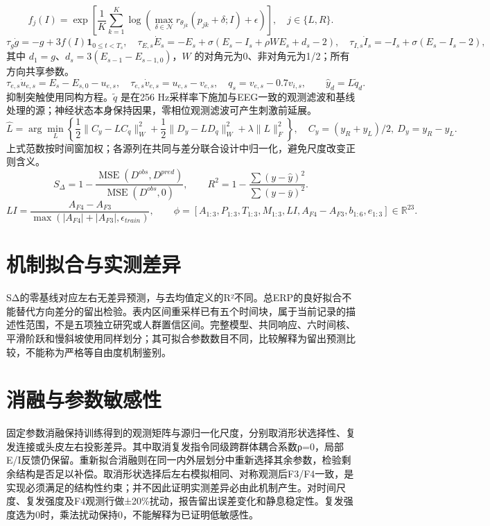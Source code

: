 \documentclass[UTF8,a4paper,11pt]{ctexart}
\begin{document}
\[
f_j(I)=\exp\left[\frac1K\sum_{k=1}^{K}\log\left(\max_{\delta\in\mathcal N}r_{\theta_{jk}}(p_{jk}+\delta;I)+\epsilon\right)\right],\quad j\in\{L,R\}.
\]
\[
\tau_g\dot g=-g+3f(I)\mathbf1_{0\le t<T_s},\quad
\tau_{E,s}\dot E_s=-E_s+\sigma(E_s-I_s+\rho WE_s+d_s-2),\quad
\tau_{I,s}\dot I_s=-I_s+\sigma(E_s-I_s-2),
\]
其中 $d_1=g$、$d_s=3(E_{s-1}-E_{s-1,0})$，$W$ 的对角元为0、非对角元为1/2；所有方向共享参数。
\[
\tau_{e,s}\dot u_{e,s}=E_s-E_{s,0}-u_{e,s},\quad
\tau_{e,s}\dot v_{e,s}=u_{e,s}-v_{e,s},\quad q_s=v_{e,s}-0.7v_{i,s},\qquad \hat y_d=L\tilde q_d.
\]
抑制突触使用同构方程。$\tilde q$ 是在256 Hz采样率下施加与EEG一致的观测滤波和基线处理的源；神经状态本身保持因果，零相位观测滤波可产生刺激前延展。
\[
\hat L=\arg\min_L\left\{\frac12\|C_y-LC_q\|_W^2+\frac12\|D_y-LD_q\|_W^2+\lambda\|L\|_F^2\right\},\quad
C_y=(y_R+y_L)/2,\ D_y=y_R-y_L.
\]
上式范数按时间窗加权；各源列在共同与差分联合设计中归一化，避免尺度改变正则含义。
\[
S_\Delta=1-\frac{\operatorname{MSE}(D^{obs},D^{pred})}{\operatorname{MSE}(D^{obs},0)},\qquad
R^2=1-\frac{\sum(y-\hat y)^2}{\sum(y-\bar y)^2}.
\]
\[
LI=\frac{A_{F4}-A_{F3}}{\max(|A_{F4}|+|A_{F3}|,\epsilon_{train})},\qquad
\phi=[A_{1:3},P_{1:3},T_{1:3},M_{1:3},LI,A_{F4}-A_{F3},b_{1:6},e_{1:3}]\in\mathbb R^{23}.
\]


\section{机制拟合与实测差异}


SΔ的零基线对应左右无差异预测，与去均值定义的R²不同。总ERP的良好拟合不能替代方向差分的留出检验。表内区间重采样已有五个时间块，属于当前记录的描述性范围，不是五项独立研究或人群置信区间。完整模型、共同响应、六时间核、平滑阶跃和慢斜坡使用同样划分；其可拟合参数数目不同，比较解释为留出预测比较，不能称为严格等自由度机制鉴别。

\section{消融与参数敏感性}

固定参数消融保持训练得到的观测矩阵与源归一化尺度，分别取消形状选择性、复发连接或头皮左右投影差异。其中取消复发指令同级跨群体耦合系数ρ=0，局部E/I反馈仍保留。重新拟合消融则在同一内外层划分中重新选择其余参数，检验剩余结构是否足以补偿。取消形状选择后左右模拟相同、对称观测后F3/F4一致，是实现必须满足的结构性约束；并不因此证明实测差异必由此机制产生。对时间尺度、复发强度及F4观测行做±20\%扰动，报告留出误差变化和静息稳定性。复发强度选为0时，乘法扰动保持0，不能解释为已证明低敏感性。
\end{document}
